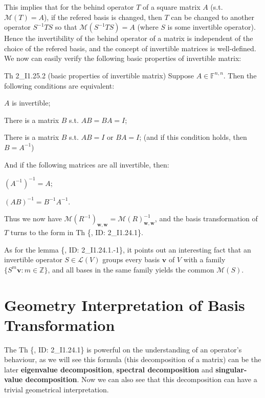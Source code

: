 \documentclass{article}
\begin{document}
This implies that for the behind operator $T$ of a square matrix $A$ (s.t. $\mathcal{M}(T) = A$), if the refered basis is changed, then $T$ can be changed to another operator $S^{-1}TS$ so that $\mathcal{M}(S^{-1}TS) = A$ (where $S$ is some invertible operator). Hence the invertibility of the behind operator of a matrix is independent of the choice of the refered basis, and the concept of invertible matrices is well-defined. We now can easily verify the following basic properties of invertible matrix:

\begin{Th}{Th 2\_I1.25.2 (basic properties of invertible matrix)}
    Suppose $A\in\mathbb{F}^{n,n}$. Then the following conditions are equivalent:
    \begin{compactenum}
        \item $A$ is invertible;        
        \item There is a matrix $B$ s.t. $AB=BA=I$; 
        \item There is a matrix $B$ s.t. $AB=I$ or $BA=I$; (and if this condition holds, then $B = A^{-1}$)
    \end{compactenum}
    And if the following matrices are all invertible, then:
    \begin{compactenum}
        \item $(A^{-1})^{-1} = A$;
        \item $(AB)^{-1} = B^{-1}A^{-1}$.
    \end{compactenum}
\end{Th}

Thus we now have $\mathcal{M}(R^{-1})_{\pmb{w}, \pmb{w}} = \mathcal{M}(R)^{-1}_{\pmb{w}, \pmb{w}}$, and the basis transformation of $T$ turns to the form in Th \{, ID: 2\_I1.24.1\}.

As for the lemma \{, ID: 2\_I1.24.1.-1\}, it points out an interesting fact that an invertible operator $S\in\mathcal{L}(V)$ groups every basis $\pmb{v}$ of $V$ with a family $\{S^{m}\pmb{v}: m\in\mathbb{Z}\}$, and all bases in the same family yields the common $\mathcal{M}(S)$.

\section{Geometry Interpretation of Basis Transformation}
The Th \{, ID: 2\_I1.24.1\} is powerful on the understanding of an operator's behaviour, as we will see this formula (this decomposition of a matrix) can be the later \textbf{eigenvalue decomposition}, \textbf{spectral decomposition} and \textbf{singular-value decomposition}. Now we can also see that this decomposition can have a trivial geometrical interpretation.
\end{document}
